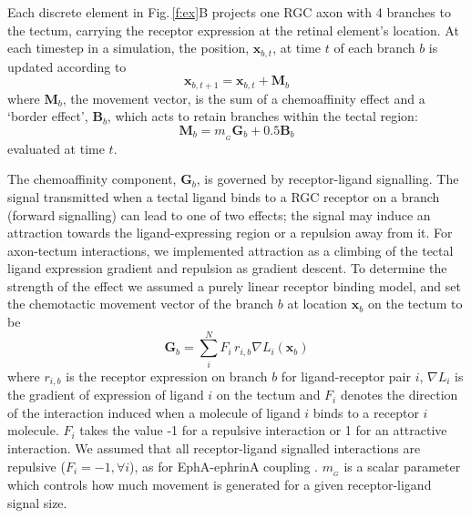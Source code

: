 \documentclass[11pt, a4paper]{article}
\begin{document}
\color{black}
Each discrete element in Fig.\,\ref{f:ex}B projects one RGC axon with 4
branches to the tectum, carrying the receptor expression at the retinal
element's location.
At each timestep in a simulation, the position, $\mathbf{x}_{b,t}$, at time
$t$ of each branch $b$ is updated according to
%
\begin{equation}
\mathbf{x}_{b,t+1} = \mathbf{x}_{b,t} + \mathbf{M}_{b}
\end{equation}
%
where $\mathbf{M}_{b}$, the movement vector, is the sum of a chemoaffinity
effect and a `border effect', $\mathbf{B}_b$, which acts to retain branches
within the tectal region:
%
\begin{equation} \label{e:mv}
\mathbf{M}_{b} = m_{\!_G} \mathbf{G}_b + 0.5 \mathbf{B}_b
\end{equation}
%
evaluated at time $t$.

The chemoaffinity component, $\mathbf{G}_b$, is governed by receptor-ligand
signalling. The signal transmitted when a tectal ligand binds to a RGC
receptor on a branch (forward signalling) can lead to one of two effects; the
signal may induce an attraction towards the ligand-expressing region or a
repulsion away from it.
%
For axon-tectum interactions, we implemented attraction as a climbing of the
tectal ligand expression gradient and repulsion as gradient descent.
%
To determine the strength of the effect we assumed a purely linear receptor
binding model, and set the chemotactic movement vector of the branch $b$ at
location $\mathbf{x}_b$ on the tectum to be
%
\begin{equation}
\mathbf{G}_b = \sum_i^N F_i\,r_{i,b} \nabla L_i(\mathbf{x}_b)
\end{equation}
%
where $r_{i,b}$ is the receptor expression on branch $b$ for ligand-receptor
pair $i$, $\nabla L_i$ is the gradient of expression of ligand $i$ on the
tectum and $F_i$ denotes the direction of the interaction induced when a
molecule of ligand $i$ binds to a receptor $i$ molecule. $F_i$ takes the value
-1 for a repulsive interaction or 1 for an attractive interaction.
%
We assumed that all
receptor-ligand signalled interactions are repulsive ($F_i=-1, \forall i$), as
for EphA-ephrinA
coupling \citep{drescher_vitro_1995,nakamoto_topographically_1996}.
%
$m_{\!_G}$ is a
scalar parameter which controls how much movement is generated for a given
receptor-ligand signal size.
\end{document}
